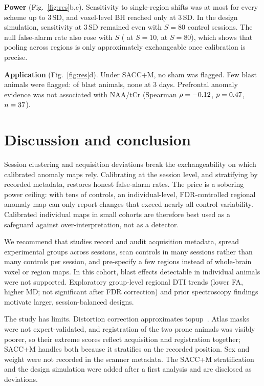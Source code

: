 \documentclass{article}
\begin{document}
\textbf{Power} (Fig.~\ref{fig:res}b,c). Sensitivity to single-region shifts was at most \PowerMax{} for every scheme up to 3\,SD, and voxel-level BH reached only \VoxPowerMax{} at 3\,SD. In the design simulation, sensitivity at 3\,SD remained \SimSensEighty{} even with $S=80$ control sessions. The null false-alarm rate also rose with $S$ (\SimNullTen{} at $S=10$, \SimNullEighty{} at $S=80$), which shows that pooling across regions is only approximately exchangeable once calibration is precise.

\textbf{Application} (Fig.~\ref{fig:res}d). Under SACC+M, no sham was flagged. Few blast animals were flagged: \AppFlagged{} of \AppNblast{} blast animals, none at 3 days. Prefrontal anomaly evidence was not associated with NAA/tCr (Spearman $\rho=-0.12$, $p=0.47$, $n=37$).

\section{Discussion and conclusion}
\label{sec:discussion}
Session clustering and acquisition deviations break the exchangeability on which calibrated anomaly maps rely. Calibrating at the session level, and stratifying by recorded metadata, restores honest false-alarm rates. The price is a sobering power ceiling: with tens of controls, an individual-level, FDR-controlled regional anomaly map can only report changes that exceed nearly all control variability. Calibrated individual maps in small cohorts are therefore best used as a safeguard against over-interpretation, not as a detector.

We recommend that studies record and audit acquisition metadata, spread experimental groups across sessions, scan controls in many sessions rather than many controls per session, and pre-specify a few regions instead of whole-brain voxel or region maps. In this cohort, blast effects detectable in individual animals were not supported. Exploratory group-level regional DTI trends (lower FA, higher MD; not significant after FDR correction) and prior spectroscopy findings~\cite{tang2024} motivate larger, session-balanced designs.

The study has limits. Distortion correction approximates topup~\cite{andersson2003}. Atlas masks were not expert-validated, and registration of the two prone animals was visibly poorer, so their extreme scores reflect acquisition and registration together; SACC+M handles both because it stratifies on the recorded position. Sex and weight were not recorded in the scanner metadata. The SACC+M stratification and the design simulation were added after a first analysis and are disclosed as deviations.
\end{document}

